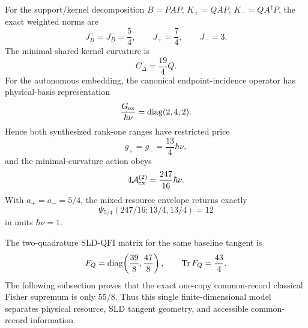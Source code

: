 For the support/kernel decomposition $B=PAP$, $K_+=QAP$, $K_-=QA^\dagger P$, the exact weighted norms are
\begin{equation}
J_B^+=J_B^-=\frac54,
\qquad
J_+=\frac74,
\qquad
J_-=3.
\label{eq:qutrit-benchmark-J}
\end{equation}
The minimal shared kernel curvature is
\begin{equation}
C_\Delta=\frac{19}{4}Q.
\end{equation}
For the autonomous embedding, the canonical endpoint-incidence operator has physical-basis representation
\begin{equation}
\frac{G_{\rm ex}}{\hbar\nu}=\operatorname{diag}(2,4,2).
\end{equation}
Hence both synthesized rank-one ranges have restricted price
\begin{equation}
g_+=g_-=\frac{13}{4}\hbar\nu,
\end{equation}
and the minimal-curvature action obeys
\begin{equation}
4\mathcal A_{\rm ex}^{(2)}=\frac{247}{16}\hbar\nu.
\end{equation}
With $a_+=a_-=5/4$, the mixed resource envelope returns exactly
\begin{equation}
\Psi_{5/4}(247/16;13/4,13/4)=12
\end{equation}
in units $\hbar\nu=1$.

The two-quadrature SLD-QFI matrix for the same baseline tangent is
\begin{equation}
F_Q=\operatorname{diag}\!\left(\frac{39}{8},\frac{47}{8}\right),
\qquad
\operatorname{Tr} F_Q=\frac{43}{4}.
\label{eq:qutrit-benchmark-QFI}
\end{equation}
The following subsection proves that the exact one-copy common-record classical Fisher supremum is only $55/8$. Thus this single finite-dimensional model separates physical resource, SLD tangent geometry, and accessible common-record information.
